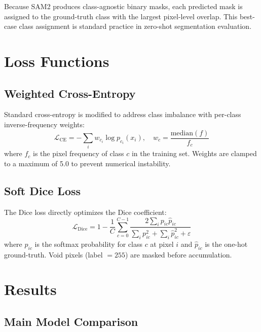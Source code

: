 \documentclass[11pt,a4paper]{article}
\begin{document}
Because SAM2 produces class-agnostic binary masks, each predicted mask is assigned to the ground-truth class with the largest pixel-level overlap. This best-case class assignment is standard practice in zero-shot segmentation evaluation.

\section{Loss Functions}

\subsection{Weighted Cross-Entropy}

Standard cross-entropy is modified to address class imbalance with per-class inverse-frequency weights:
\begin{equation}
\mathcal{L}_{\text{CE}} = -\sum_{i} w_{c_i} \log p_{c_i}(x_i), \quad w_c = \frac{\text{median}(f)}{\,f_c\,}
\end{equation}
where $f_c$ is the pixel frequency of class $c$ in the training set. Weights are clamped to a maximum of 5.0 to prevent numerical instability.

\subsection{Soft Dice Loss}

The Dice loss directly optimizes the Dice coefficient:
\begin{equation}
\mathcal{L}_{\text{Dice}} = 1 - \frac{1}{C} \sum_{c=0}^{C-1} \frac{2 \sum_i p_{ic} \hat{p}_{ic}}{\sum_i p_{ic}^2 + \sum_i \hat{p}_{ic}^2 + \varepsilon}
\end{equation}
where $p_{ic}$ is the softmax probability for class $c$ at pixel $i$ and $\hat{p}_{ic}$ is the one-hot ground-truth. Void pixels (label $=255$) are masked before accumulation.

\section{Results}

\subsection{Main Model Comparison}
\end{document}
